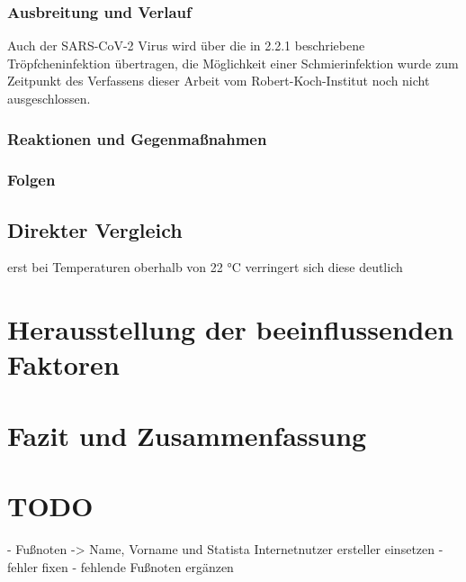\documentclass[12pt]{article}
\begin{document}
\subsubsection{Ausbreitung und Verlauf}
Auch der SARS-CoV-2 Virus wird über die in 2.2.1 beschriebene Tröpfcheninfektion übertragen, die Möglichkeit einer Schmierinfektion wurde zum Zeitpunkt des Verfassens dieser Arbeit vom Robert-Koch-Institut noch nicht ausgeschlossen. 
\subsubsection{Reaktionen und Gegenmaßnahmen}
\subsubsection{Folgen}
\subsection{Direkter Vergleich }
erst bei Temperaturen oberhalb von 22 °C verringert sich diese deutlich
\section{Herausstellung der beeinflussenden Faktoren}
\section{Fazit und Zusammenfassung}
\section{TODO}
- Fußnoten -> Name, Vorname und Statista Internetnutzer ersteller einsetzen
- fehler fixen
- fehlende Fußnoten ergänzen

\newpage
\printbibliography
\end{document}
